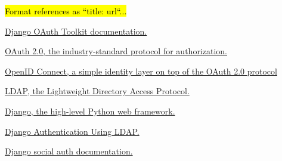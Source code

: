\documentclass[acmsmall,screen,10pt,nonacm]{acmart}
\begin{document}
\begin{abstract}

\end{abstract}


\maketitle







\hl{Format references as ``title: url``...}
\begin{thebibliography}{9}

	\href{https://django-oauth-toolkit.readthedocs.io/en/latest/}{Django OAuth Toolkit documentation.}

	\href{https://oauth.net/2/}{OAuth 2.0, the industry-standard protocol for authorization.}

	\href{https://openid.net/connect/}{OpenID Connect, a simple identity layer on top of the OAuth 2.0 protocol}

	\href{https://ldap.com/}{LDAP, the Lightweight Directory Access Protocol.}

	\href{https://www.djangoproject.com/}{Django, the high-level Python web framework.}

	\href{https://django-auth-ldap.readthedocs.io/en/latest/}{Django Authentication Using LDAP.}

	\href{https://python-social-auth.readthedocs.io/en/latest/configuration/django.html}{Django social auth documentation.}

\end{thebibliography}
\end{document}
